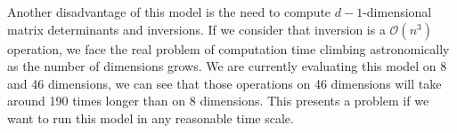 Another disadvantage of this model is the need to compute $d-1$-dimensional matrix determinants
  and inversions.  If we consider that inversion is a $\mathcal{O}(n^3)$ operation, we face the real
  problem of computation time climbing astronomically as the number of dimensions grows.  We are
  currently evaluating this model on 8 and 46 dimensions, we can see that those operations on 46
  dimensions will take around 190 times longer than on 8 dimensions.  This presents a problem if we
  want to run this model in any reasonable time scale.

